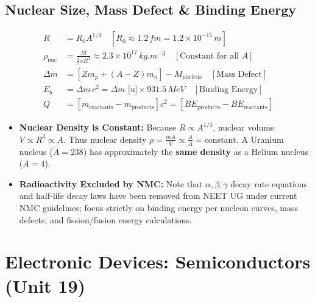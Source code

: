 \documentclass[10pt,twoside,openright]{book}
\begin{document}
\subsection{Nuclear Size, Mass Defect \& Binding Energy}

\begin{formulabox}
\begin{align}
  R &= R_0 A^{1/3} \quad [R_0 \approx 1.2\,\si{fm} = 1.2\times 10^{-15}\,\si{m}] \\
  \rho_{\text{nuc}} &= \frac{M}{\frac{4}{3}\pi R^3} \approx 2.3\times 10^{17}\,\si{kg.m^{-3}} \quad [\text{Constant for all } A] \\
  \Delta m &= [Z m_p + (A - Z)m_n] - M_{\text{nucleus}} \quad [\text{Mass Defect}] \\
  E_b &= \Delta m\,c^2 = \Delta m\text{ [u]}\times 931.5\,\si{MeV} \quad [\text{Binding Energy}] \\
  Q &= [m_{\text{reactants}} - m_{\text{products}}]c^2 = [BE_{\text{products}} - BE_{\text{reactants}}]
\end{align}
\end{formulabox}

\begin{trapbox}
\begin{itemize}
  \item \textbf{Nuclear Density is Constant:} Because $R \propto A^{1/3}$, nuclear volume $V \propto R^3 \propto A$. Thus nuclear density $\rho = \frac{m A}{V} \propto \frac{A}{A} = \text{constant}$. A Uranium nucleus ($A=238$) has approximately the \textbf{same density} as a Helium nucleus ($A=4$).
  \item \textbf{Radioactivity Excluded by NMC:} Note that $\alpha, \beta, \gamma$ decay rate equations and half-life decay laws have been removed from NEET UG under current NMC guidelines; focus strictly on binding energy per nucleon curves, mass defects, and fission/fusion energy calculations.
\end{itemize}
\end{trapbox}

\newpage

\section{Electronic Devices: Semiconductors (Unit 19)}
\end{document}
